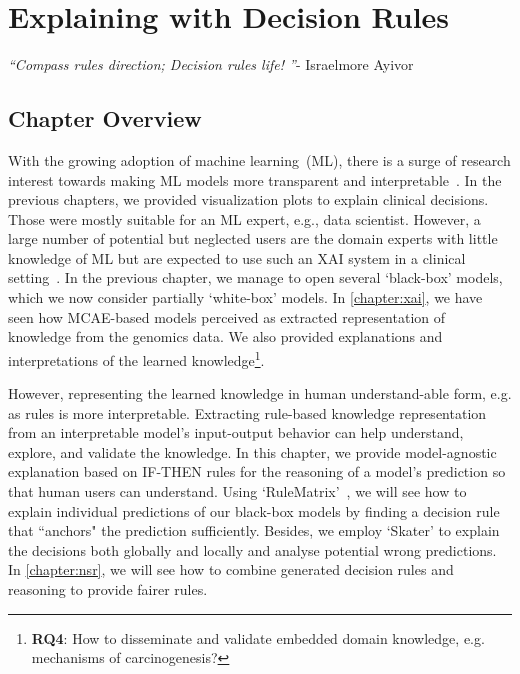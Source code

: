 \chapter{Explaining with Decision Rules}\label{chapter:xai_rules}
\textit{``Compass rules direction; Decision rules life! ''}- Israelmore Ayivor

\section{Chapter Overview} \label{chapter_7:cw}
With the growing adoption of machine learning~(ML), there is a surge of research interest towards making ML models more transparent and interpretable~\cite{ming2018rulematrix}. In the previous chapters, we provided visualization plots to  explain clinical decisions. Those were mostly suitable for an ML expert, e.g., data scientist. However, a large number of potential but neglected users are the domain experts with little knowledge of ML but are expected to use such an XAI system in a clinical setting~\cite{ming2018rulematrix}. In the previous chapter, we manage to open several `black-box' models, which we now consider partially `white-box' models. In \cref{chapter:xai}, we have seen how MCAE-based models perceived as extracted representation of knowledge from the genomics data. We also provided explanations and interpretations of the learned knowledge\footnote{ \textbf{RQ4}: How to disseminate and validate embedded domain knowledge, e.g.  mechanisms of carcinogenesis?}.  

\hspace*{3.5mm} However, representing the learned knowledge in human understand-able form, e.g. as rules is more interpretable. 
Extracting rule-based knowledge representation from an interpretable model's input-output behavior can help understand, explore, and validate the knowledge. In this chapter, we provide model-agnostic explanation based on IF-THEN rules for the reasoning of a model's prediction so that human users can understand. %
Using `RuleMatrix'~\cite{ming2018rulematrix}, we will see how to explain individual predictions of our black-box models by finding a decision rule that ``anchors" the prediction sufficiently. Besides, we employ `Skater' to explain the decisions both globally and locally and analyse potential wrong predictions. In \cref{chapter:nsr}, we will see how to combine generated decision rules and reasoning to provide  fairer rules. 

